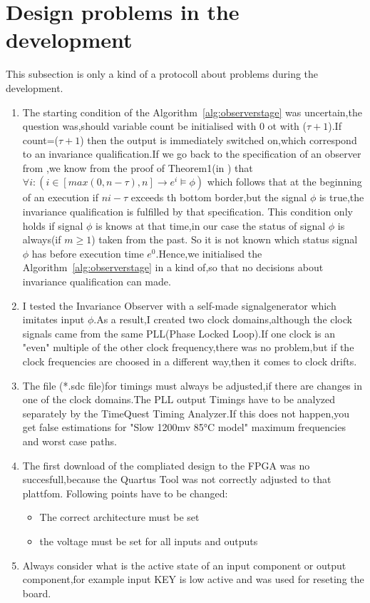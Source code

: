 \newpage
\section{Design problems in the development}

This subsection is only a kind of a protocoll about problems during the development.
\begin{enumerate}
\item The starting condition of the Algorithm~\ref{alg:observerstage} was uncertain,the question was,should variable
count be initialised with 0 ot with ($\tau + 1$).If count=($\tau + 1$) then the output is immediately switched on,which
correspond to an invariance qualification.If we go back to the specification of an observer from \cite{RTFMBJ13},we know from
the proof of Theorem1(in \cite{RTFMBJ13}) that $\forall i:(i \in [max(0,n-\tau),n] \rightarrow e^i \models \phi)$ which follows 
that at the beginning of an execution if $ni-\tau$ exceeds th bottom border,but the signal $\phi$ is true,the invariance qualification
is fulfilled by that specification. 
This condition only holds if signal $\phi$ is knows at that time,in our case the status of signal $\phi$ is always(if $m \ge 1$) taken from the past.
So it is not known which status signal $\phi$ has before execution time $e^0$.Hence,we initialised the Algorithm~\ref{alg:observerstage} in a kind of,so that
no decisions about invariance qualification can made.
\item I tested the Invariance Observer with a  self-made signalgenerator which imitates input $\phi$.As a result,I created two clock domains,although the clock signals
came from the same PLL(Phase Locked Loop).If one clock is an "even" multiple of the other clock frequency,there was no problem,but if the clock frequencies are choosed in a different way,then
it comes to clock drifts.
\item The file (*.sdc file)for timings must always be adjusted,if there are changes in one of the clock domains.The PLL output Timings have to be analyzed separately by the
TimeQuest Timing Analyzer.If this does not happen,you get false estimations for "Slow 1200mv 85°C model" maximum frequencies and worst case paths.
\item The first download of the compliated design to the FPGA was no succesfull,because the Quartus Tool was not correctly adjusted to that plattfom.
Following points have to be changed:
\begin{itemize}
\item The correct architecture must be set
\item the voltage must be set for all inputs and outputs
\end{itemize}
\item Always consider what is the active state of an input component or output component,for example
input KEY is low active and was used for reseting the board. 
\end{enumerate}
